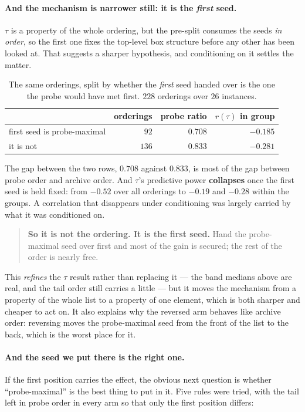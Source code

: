 \documentclass[11pt,a4paper]{article}
\begin{document}
\paragraph{And the mechanism is narrower still: it is the \emph{first} seed.}
$\tau$ is a property of the whole ordering, but the pre-split consumes the
seeds \emph{in order}, so the first one fixes the top-level box structure
before any other has been looked at.  That suggests a sharper hypothesis, and
conditioning on it settles the matter.

\begin{table}[h]
\centering
\caption{The same orderings, split by whether the \emph{first} seed handed over
is the one the probe would have met first.  $228$ orderings over $26$
instances.}
\label{tab:firstseed}
\begin{tabular}{lrrr}
\toprule
 & orderings & probe ratio & $r(\tau)$ in group \\
\midrule
first seed is probe-maximal & $92$ & $\mathbf{0.708}$ & $-0.185$ \\
it is not                           & $136$ & $0.833$ & $-0.281$ \\
\bottomrule
\end{tabular}
\end{table}

\noindent
The gap between the two rows, $0.708$ against $0.833$, is most of the gap
between probe order and archive order.  And $\tau$'s predictive power
\textbf{collapses} once the first seed is held fixed: from $-0.52$ over all
orderings to $-0.19$ and $-0.28$ within the groups.  A correlation that
disappears under conditioning was largely carried by what it was conditioned
on.

\begin{quote}
\textbf{So it is not the ordering.  It is the first seed.}  Hand the
probe-maximal seed over first and most of the gain is secured; the rest of the
order is nearly free.
\end{quote}

\noindent
This \emph{refines} the $\tau$ result rather than replacing it --- the band
medians above are real, and the tail order still carries a little --- but it
moves the mechanism from a property of the whole list to a property of one
element, which is both sharper and cheaper to act on.  It also explains why the
reversed arm behaves like archive order: reversing moves the probe-maximal seed
from the front of the list to the back, which is the worst place for it.

\paragraph{And the seed we put there is the right one.}
If the first position carries the effect, the obvious next question is whether
``probe-maximal'' is the best thing to put in it.  Five rules were tried, with
the tail left in probe order in every arm so that only the first position
differs:
\end{document}
